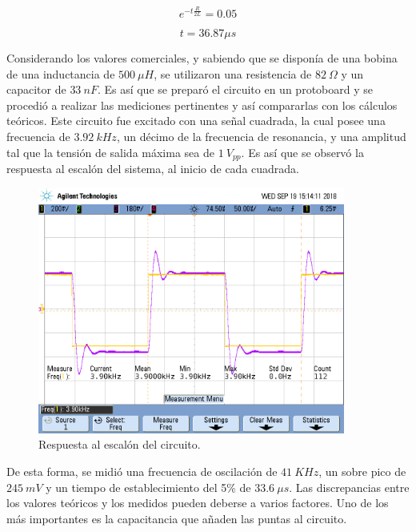 \begin{equation}
	e^{-t\frac{R}{2L}} = 0.05
\end{equation}

\begin{equation}
	t=36.87\mu s
\end{equation}

Considerando los valores comerciales, y sabiendo que se disponía de una bobina de una inductancia de $500 \ \mu H$, se utilizaron una resistencia de $82 \ \Omega$ y un capacitor de $33 \ nF$. Es así que se preparó el circuito en un protoboard y se procedió a realizar las mediciones pertinentes y así compararlas con los cálculos teóricos. Este circuito fue excitado con una señal cuadrada, la cual posee una frecuencia de $3.92 \ kHz$, un décimo de la frecuencia de resonancia, y una amplitud tal que la tensión de salida máxima sea de $1 \ V_{pp}$. Es así que se observó la respuesta al escalón del sistema, al inicio de cada cuadrada.

\begin{figure}[H]
	\centering
	\includegraphics[width=0.9\textwidth, trim = {0 3.4cm 0.4cm 2cm},clip]{Ejercicio2/Mediciones/A/waveform2.png}
\caption{Respuesta al escalón del circuito.}
	\label{fig:rtaescalon}
\end{figure}

De esta forma, se midió una frecuencia de oscilación de $41 \ KHz $, un sobre pico de $245 \ mV$ y un tiempo de establecimiento del 5\% de $33.6 \ \mu s$. Las discrepancias entre los valores teóricos y los medidos pueden deberse a varios factores. Uno de los más importantes es la capacitancia que añaden las puntas al circuito.

